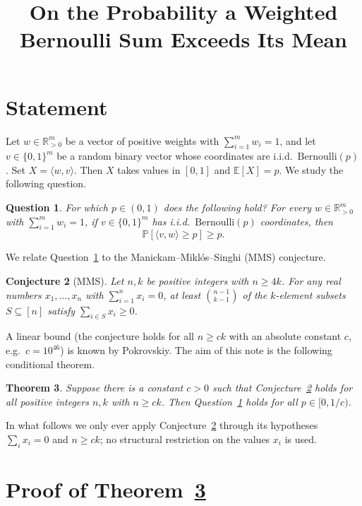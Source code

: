 \documentclass[11pt]{amsart}
\theoremstyle{plain}
\newtheorem{theorem}{Theorem}
\newtheorem{conjecture}[theorem]{Conjecture}
\newtheorem{question}[theorem]{Question}
\def\bE{\mathbb{E}}
\def\bR{\mathbb{R}}
\def\Pb{\mathbb{P}}
\begin{document}
\title{On the Probability a Weighted Bernoulli Sum Exceeds Its Mean}
\author{}
\date{}
\maketitle

\section{Statement}

Let $w\in\bR_{>0}^m$ be a vector of positive weights with $\sum_{i=1}^m w_i=1$, and
let $v\in\{0,1\}^m$ be a random binary vector whose coordinates are i.i.d.\
$\mathrm{Bernoulli}(p)$. Set $X=\langle w,v\rangle$. Then $X$ takes values in $[0,1]$
and $\bE[X]=p$. We study the following question.

\begin{question}\label{q:prob}
For which $p\in(0,1)$ does the following hold? For every $w\in\bR_{>0}^m$ with
$\sum_{i=1}^m w_i=1$, if $v\in\{0,1\}^m$ has i.i.d.\ $\mathrm{Bernoulli}(p)$
coordinates, then
\[
\Pb[\langle v,w\rangle\ge p]\ge p .
\]
\end{question}

We relate Question~\ref{q:prob} to the Manickam--Mikl\'os--Singhi (MMS) conjecture.

\begin{conjecture}[MMS]\label{conj:MMS}
Let $n,k$ be positive integers with $n\ge 4k$. For any real numbers
$x_1,\dots,x_n$ with $\sum_{i=1}^n x_i=0$, at least $\binom{n-1}{k-1}$ of the
$k$-element subsets $S\subseteq[n]$ satisfy $\sum_{i\in S}x_i\ge 0$.
\end{conjecture}

A linear bound (the conjecture holds for all $n\ge ck$ with an absolute constant
$c$, e.g.\ $c=10^{46}$) is known by Pokrovskiy. The aim of this note is the
following conditional theorem.

\begin{theorem}\label{thm:main}
Suppose there is a constant $c>0$ such that Conjecture~\ref{conj:MMS} holds for
all positive integers $n,k$ with $n\ge ck$. Then Question~\ref{q:prob} holds for
all $p\in[0,1/c)$.
\end{theorem}

In what follows we only ever apply Conjecture~\ref{conj:MMS} through its hypotheses
$\sum_i x_i=0$ and $n\ge ck$; no structural restriction on the values $x_i$ is
used.

\section{Proof of Theorem~\ref{thm:main}}
\end{document}
